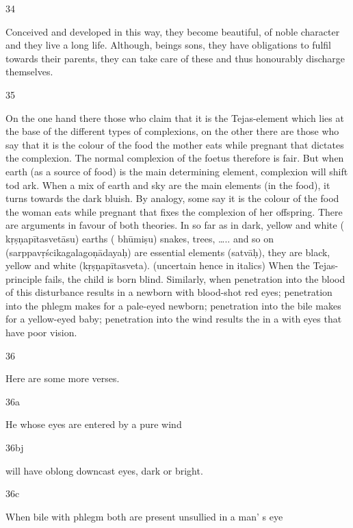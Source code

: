 \begin{translation}
\begin{tt}
\item[34]

Conceived and developed in this way, they become beautiful, of noble 
  character and they live a long life. Although, beings sons, they have obligations 
  to fulfil towards their parents, they can take care of these and thus honourably 
  discharge themselves.
  
\item[35]

On the one hand there those who claim that it is the Tejas-element 
  which lies at the base of the different types of complexions, on the other there 
  are those who say that it is the colour of the food the mother eats while 
  pregnant that dictates the complexion. The normal complexion of the foetus 
  therefore is fair. But when earth (as a source of food) is the main determining 
  element, complexion will shift tod ark. When a mix of earth and sky are the 
  main elements (in the food), it turns towards the dark bluish. By analogy, some 
  say it is the colour of the food the woman eats while pregnant that fixes the 
  complexion of her offspring. There are arguments in favour of both theories. 
  In so far as in dark, yellow and white ( kṛṣṇapītasvetāsu)  earths ( bhūmiṣu) 
  snakes, trees, ….. and so on (sarppavṛścikagalagoṇādayaḥ) are essential 
  elements (satvāḥ), they are black, yellow and white (kṛṣṇapītasveta). (uncertain 
  hence in italics)
  When the Tejas-principle fails, the child is born blind. Similarly, when 
  penetration into the blood of this disturbance results in a newborn with 
  blood-shot red eyes; penetration into the phlegm makes for a pale-eyed 
  newborn; penetration into the bile makes for a yellow-eyed baby; penetration 
  into the wind results  the in a with eyes that have poor vision. 
  
\item[36]

Here are some more verses.
  
\item[36a]

He whose eyes are entered by a pure wind
  
\item[36bj]

will have oblong downcast eyes, dark or bright.
  
\item[36c]

When bile with phlegm both are present unsullied in a man’ s eye 
  

\end{tt}
\end{translation}
